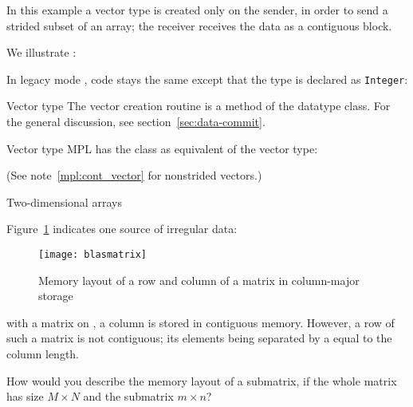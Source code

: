 In this example a vector type is created only on the sender, in order to send
a strided subset of an array; the receiver receives the data as a contiguous block.

We illustrate :
%

In legacy mode , code stays the same except that the type is
declared as \lstinline{Integer}:
%

\begin{pythonnote}{Vector type}
  The vector creation routine is a method of the datatype class.
  For the general discussion, see section~\ref{sec:data-commit}.
\end{pythonnote}


\begin{mplnote}{Vector type}
  \label{mpl:strided_vector}
  MPL has the  class as equivalent
  of the vector type:

  (See note~\ref{mpl:cont_vector} for nonstrided vectors.)
\end{mplnote}

 {Two-dimensional arrays}

Figure~\ref{fig:blasmatrix} indicates one source of irregular
data:
%
\begin{figure}[t]
  \texttt{[image: blasmatrix]}
  \caption{Memory layout of a row and column of a matrix in column-major storage}
  \label{fig:blasmatrix}
\end{figure}
%
with a matrix on , a column is
stored in contiguous memory. However, a row of such a matrix
is not contiguous; its elements being separated by a 
equal to the column length.

\begin{exercise}
  \label{ex:submatrix}
  How would you describe the memory layout of a submatrix,
  if the whole matrix has size $M\times N$ and the submatrix $m\times n$?
\end{exercise}

